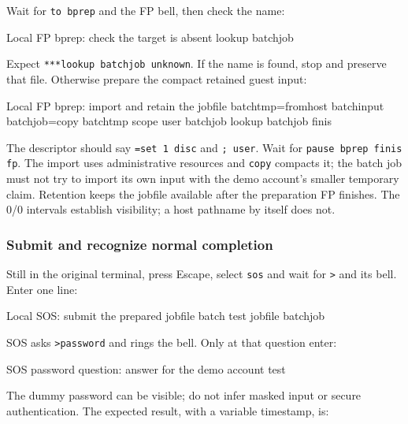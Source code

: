 Wait for \texttt{to bprep} and the FP bell, then check the name:

\begin{commandexample}{Local FP bprep: check the target is absent}
lookup batchjob
\end{commandexample}

Expect \texttt{***lookup batchjob unknown}. If the name is found, stop and
preserve that file. Otherwise prepare the compact retained guest input:

\begin{commandexample}{Local FP bprep: import and retain the jobfile}
batchtmp=fromhost batchinput
batchjob=copy batchtmp
scope user batchjob
lookup batchjob
finis
\end{commandexample}

The descriptor should say \texttt{=set 1 disc} and \texttt{; user}. Wait for
\texttt{pause bprep finis fp}. The import uses administrative resources and
\texttt{copy} compacts it; the batch job must not try to import its own input
with the demo account's smaller temporary claim. Retention keeps the jobfile
available after the preparation FP finishes. The 0/0 intervals establish
visibility; a host pathname by itself does not.

\subsubsection{Submit and recognize normal completion}\label{mips-ts-batch-submit}

Still in the original terminal, press Escape, select \texttt{sos} and wait for
\texttt{>} and its bell. Enter one line:

\begin{commandexample}{Local SOS: submit the prepared jobfile}
batch test jobfile batchjob
\end{commandexample}

SOS asks \texttt{>password} and rings the bell. Only at that question enter:

\begin{commandexample}{SOS password question: answer for the demo account}
test
\end{commandexample}

The dummy password can be visible; do not infer masked input or secure
authentication. The expected result, with a variable timestamp, is:

